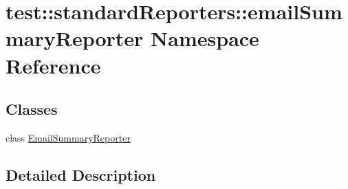\hypertarget{namespacetest_1_1standardReporters_1_1emailSummaryReporter}{\section{test\-:\-:standard\-Reporters\-:\-:email\-Summary\-Reporter \-Namespace \-Reference}
\label{d0/d5b/namespacetest_1_1standardReporters_1_1emailSummaryReporter}
}
\subsection*{\-Classes}
\begin{DoxyCompactItemize}
\item 
class \hyperlink{classtest_1_1standardReporters_1_1emailSummaryReporter_1_1EmailSummaryReporter}{\-Email\-Summary\-Reporter}
\end{DoxyCompactItemize}


\subsection{\-Detailed \-Description}
\begin{DoxyVerb}

\end{DoxyVerb}
 